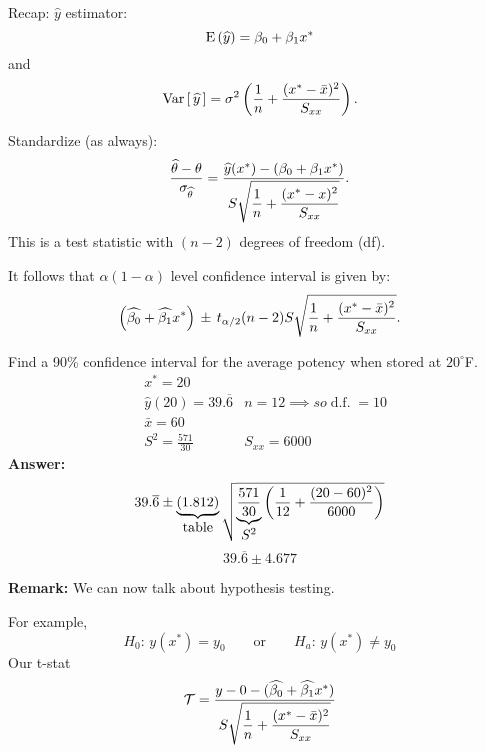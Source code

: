 \nnl Recap: $\widehat y$ estimator: $$\E{\widehat y} = \beta_0 + \beta_1 x^*$$ and $$\Varb{\widehat y} = \sigma^2 \pars{\over n + \dfrac{(x^* - \bar x)^2}{S_{xx}}}.$$

\nl Standardize (as always):
$$\dfrac{\widehat{\theta} - \theta}{\sigma_{\widehat{\theta}}} = \frac{\widehat y (x^*) - (\beta_0 + \beta_1 x^*)}{\displaystyle S \sqrt{\dfrac{1}{n} + \dfrac{(x^* - x)^2}{S_{xx}}}}.$$
This is a test statistic with $(n-2)$ degrees of freedom (df).

\nl It follows that $\alpha (1-\alpha)$ level confidence interval is given by:
$$\pars{\widehat{\beta_0} + \widehat{\beta_1}x^*} \,\pm\, t_{\alpha / 2} (n-2) S \sqrt{\dfrac{1}{n} + \dfrac{(x^* - \bar x)^2}{S_{xx}}}.$$

\example Find a 90\% confidence interval for the average potency when stored at $20^{\circ}$F. 
\begin{align*}
    &x^* = 20\\
    &\widehat y(20) = 39.\overline6
    &n=12 \implies so \operatorname{d.f.} = 10\\
    & \bar x = 60\\
    & S^2 = \frac{571}{30}
    & S_{xx} = 6000
\end{align*}
\textbf{Answer:}
$$39.\overline6 \pm \underbrace{(1.812)}_{\textstyle \text{table}} \sqrt{ \displaystyle \underbrace{\dfrac{571}{30}}_{\textstyle S^2} \pars{\over{12} + \frac{(20-60)^2}{6000}}}$$
$$39.\overline6 \pm 4.677$$

\nl \textbf{Remark:} We can now talk about hypothesis testing.

\nl For example,
$$H_0: \, y(x^*) = y_0 \qquad \text{or} \qquad H_a : \, y(x^*) \neq y_0$$
Our t-stat
$$\mathcal T = \dfrac{y-0 - (\widehat{\beta_0} + \widehat{\beta_1}x^* )}{\displaystyle S \sqrt{\over n + \frac{(x^* - \bar x)^2}{S_{xx}}}}$$